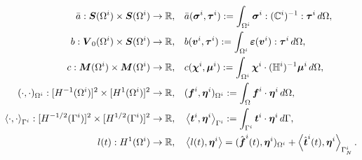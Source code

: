 \documentclass[12pt,a4paper]{scrbook}
\begin{document}
\newpage
\begin{align*}
\bar{a}:\mbox{\boldmath$S$}(\Omega^i)\times \mbox{\boldmath$S$}(\Omega^i)\rightarrow {\mathbb R},\quad &  \bar{a}(\mbox{\boldmath$\sigma$}^i, \mbox{\boldmath$\tau$}^i):= \int_{\Omega^i} \mbox{\boldmath$\sigma$}^i : ({\mathbb C}^{i})^{-1}:\mbox{\boldmath$\tau$}^i\, d\Omega,\\
b:\mbox{\boldmath$V$}_0(\Omega^i)\times \mbox{\boldmath$S$}(\Omega^i)\rightarrow {\mathbb R},\quad &  b(\mbox{\boldmath$v$}^i, \mbox{\boldmath$\tau$}^i):= \int_{\Omega^i} \mbox{\boldmath$\varepsilon$}(\mbox{\boldmath$v$}^i) : \mbox{\boldmath$\tau$}^i\, d\Omega,\\
c:\mbox{\boldmath$M$}(\Omega^i)\times \mbox{\boldmath$M$}(\Omega^i)\rightarrow {\mathbb R},\quad &  c(\mbox{\boldmath$\chi$}^i, \mbox{\boldmath$\mu$}^i):= \int_{\Omega^i} \mbox{\boldmath$\chi$}^i\cdot(\mathbb{H}^i)^{-1}  \mbox{\boldmath$\mu$}^i\, d\Omega,\\
(\cdot,\cdot)_{\Omega^i}:[H^{-1}(\Omega^i)]^2\times [H^1(\Omega^i)]^2 \rightarrow {\mathbb R},\quad & ( \mbox{\boldmath$f$}^i, \mbox{\boldmath$\eta$}^i)_{\Omega^i} := \int_{\Omega} \mbox{\boldmath$f$}^i \cdot \mbox{\boldmath$\eta$}^i \, d\Omega,\\
\left\langle \cdot,\cdot\right\rangle_{\Gamma^i}:[H^{-1/2}(\Gamma^i)]^2\times [H^{1/2}(\Gamma^i)]^2 \rightarrow {\mathbb R},\quad &\left\langle \mbox{\boldmath$t$}^i, \mbox{\boldmath$\eta$}^i \right\rangle_{\Gamma^i} := \int_{\Gamma^i} \mbox{\boldmath$t$}^i \cdot \mbox{\boldmath$\eta$}^i \, d\Gamma, \\
l(t):H^{1}(\Omega^i) \rightarrow {\mathbb R},\quad &  \left\langle l(t),\mbox{\boldmath$\eta$}^{i}\right\rangle=(\hat{\mbox{\boldmath$f$}}^i(t), \mbox{\boldmath$\eta$}^i)_{\Omega^i}
+ \left\langle \hat{\mbox{\boldmath$t$}}^i(t), \mbox{\boldmath$\eta$}^i \right\rangle_{\Gamma_N^i}.
\end{align*}
\end{document}
